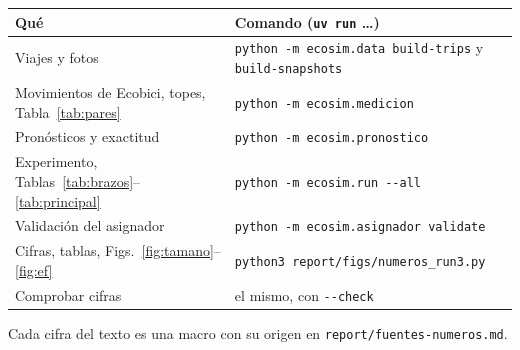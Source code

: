 \documentclass[conference,letterpaper,10pt]{IEEEtran}
\begin{document}
\begin{center}\footnotesize
\begin{tabularx}{\columnwidth}{@{}p{2.7cm}Y@{}}
\toprule
Qué & Comando (\texttt{uv run} \dots) \\
\midrule
Viajes y fotos & \texttt{python -m ecosim.data build-trips} y \texttt{build-snapshots} \\
Movimientos de Ecobici, topes, Tabla~\ref{tab:pares} & \texttt{python -m ecosim.medicion} \\
Pronósticos y exactitud & \texttt{python -m ecosim.pronostico} \\
Experimento, Tablas~\ref{tab:brazos}--\ref{tab:principal} & \texttt{python -m ecosim.run -{}-all} \\
Validación del asignador & \texttt{python -m ecosim.asignador validate} \\
Cifras, tablas, Figs.~\ref{fig:tamano}--\ref{fig:ef} & \texttt{python3 report/figs/numeros\_run3.py} \\
Comprobar cifras & el mismo, con \texttt{-{}-check} \\
\bottomrule
\end{tabularx}
\end{center}
Cada cifra del texto es una macro con su origen en \texttt{report/fuentes-numeros.md}.
\end{document}
